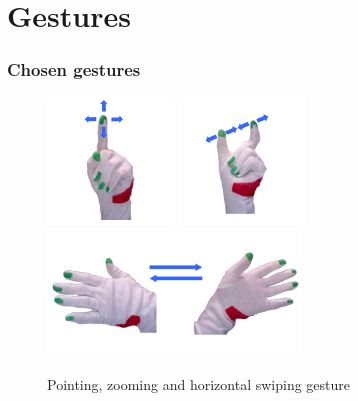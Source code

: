 \documentclass{beamer}
\begin{document}
	\section{Gestures}
	\begin{frame}
		\frametitle{Chosen gestures}
		\begin{figure}
			\hspace*{-2cm}
			\includegraphics[width=0.3\textwidth]{images/gesture_pointing} \hspace*{0.1cm}
			\includegraphics[width=0.3\textwidth]{images/gesture_zooming} \hspace*{0.1cm}
			\includegraphics[width=0.6\textwidth]{images/gesture_swiping} 
			\caption{Pointing, zooming and horizontal swiping gesture}
		\end{figure}
	\end{frame}
\end{document}
